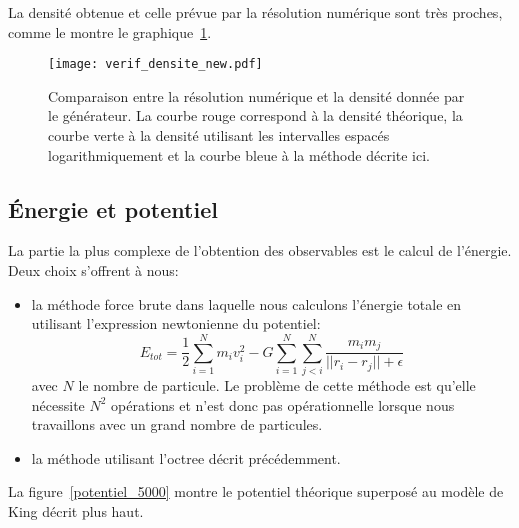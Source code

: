 			La densité obtenue et celle prévue par la résolution numérique sont très proches,
			comme le montre le graphique~\ref{Comp_gene-theo}.
			\begin{figure}[h!]
				\centering \texttt{[image: verif\_densite\_new.pdf]}
				\caption{Comparaison entre la résolution numérique et la densité donnée par le
				générateur\label{Comp_gene-theo}. La courbe rouge correspond à la densité théorique, la
				courbe verte à la densité utilisant les intervalles espacés logarithmiquement et la courbe bleue
				à la méthode décrite ici.}
			\end{figure}

		\subsection{Énergie et potentiel}

			La partie la plus complexe de l'obtention des observables est le calcul de l'énergie. Deux
			choix s'offrent à nous:
			\begin{itemize}
				\item la méthode force brute dans laquelle nous calculons l'énergie totale en utilisant
					l'expression newtonienne du potentiel:
					$$
						E_{tot} = \frac{1}{2}\sum_{i = 1}^{N} m_i v_i^2 - G \sum_{i = 1}^{N} \sum_{j < i}^N \dfrac{m_i m_j}{||r_i - r_j|| + \epsilon}
					$$
					avec $N$ le nombre de particule. Le problème de cette méthode est qu'elle nécessite $N^2$
					opérations et n'est donc pas opérationnelle lorsque nous travaillons avec un grand
					nombre de particules.

				\item la méthode utilisant l'octree décrit précédemment.
		\end{itemize}
		La figure~\ref{potentiel_5000} montre le
		potentiel théorique superposé au modèle de King décrit plus haut.

